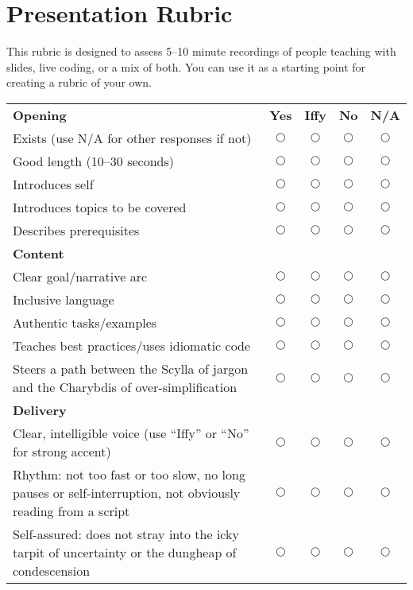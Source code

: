 \chapter{Presentation Rubric}\label{s:teacheval}

This rubric is designed to assess 5--10 minute recordings of people
teaching with slides, live coding, or a mix of both.  You can use it
as a starting point for creating a rubric of your own.

{\small
\begin{longtable}{p{}cccc}
  \textbf{Opening} & \textbf{Yes} & \textbf{Iffy} & \textbf{No} & \textbf{N/A} \\
  Exists (use N/A for other responses if not) & $\bigcirc$ & $\bigcirc$ & $\bigcirc$ & $\bigcirc$ \\
  Good length (10--30 seconds) & $\bigcirc$ & $\bigcirc$ & $\bigcirc$ & $\bigcirc$ \\
  Introduces self & $\bigcirc$ & $\bigcirc$ & $\bigcirc$ & $\bigcirc$ \\
  Introduces topics to be covered & $\bigcirc$ & $\bigcirc$ & $\bigcirc$ & $\bigcirc$ \\
  Describes prerequisites & $\bigcirc$ & $\bigcirc$ & $\bigcirc$ & $\bigcirc$ \\

  \textbf{Content} & & & & \\
  Clear goal/narrative arc & $\bigcirc$ & $\bigcirc$ & $\bigcirc$ & $\bigcirc$ \\
  Inclusive language & $\bigcirc$ & $\bigcirc$ & $\bigcirc$ & $\bigcirc$ \\
  Authentic tasks/examples & $\bigcirc$ & $\bigcirc$ & $\bigcirc$ & $\bigcirc$ \\
  Teaches best practices/uses idiomatic code & $\bigcirc$ & $\bigcirc$ & $\bigcirc$ & $\bigcirc$ \\
  Steers a path between the Scylla of jargon and the Charybdis of over-simplification & $\bigcirc$ & $\bigcirc$ & $\bigcirc$ & $\bigcirc$ \\

  \textbf{Delivery} & & & & \\
  Clear, intelligible voice (use ``Iffy'' or ``No'' for strong accent) & $\bigcirc$ & $\bigcirc$ & $\bigcirc$ & $\bigcirc$ \\
  Rhythm: not too fast or too slow, no long pauses or self-interruption, not obviously reading from a script & $\bigcirc$ & $\bigcirc$ & $\bigcirc$ & $\bigcirc$ \\
  Self-assured: does not stray into the icky tarpit of uncertainty or the dungheap of condescension & $\bigcirc$ & $\bigcirc$ & $\bigcirc$ & $\bigcirc$ \\


\end{longtable}}
